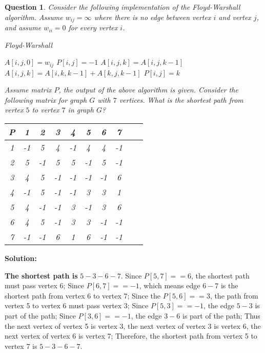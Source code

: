 \documentclass[10.5pt]{article}
\newtheorem{Q}{Question}
\begin{document}
\begin{Q}
	Consider the following implementation of the Floyd-Warshall algorithm. Assume $w_{ij}=\infty$ where there is no edge between vertex $i$ and vertex $j$, and assume $w_{ii}=0$ for every vertex $i$.
	\begin{algorithm}
		\caption{Floyd-Warshall}
		\label{alg:Floyd-Warshall}
		\begin{algorithmic}
			\STATE $A[i,j,0]=w_{ij}$
			\STATE $P[i, j] = -1$
			\ENDFOR
			\ENDFOR
			\STATE $A[i, j, k] = A[i, j, k - 1]$
			\STATE $A[i, j, k] = A[i, k, k - 1] + A[k, j, k - 1]$
			\STATE $P[i, j] = k$
			\ENDIF
			\ENDFOR
			\ENDFOR
			\ENDFOR
		\end{algorithmic}
	\end{algorithm}
	
	Assume matrix $P$, the output of the above algorithm is given. Consider the following matrix for graph $G$ with $7$ vertices. What is the shortest path from vertex $5$ to vertex $7$ in graph $G$?
	
	\begin{table}[htbp]
		\begin{center}  
			\begin{tabular}{|c|c|c|c|c|c|c|c|c| p{3cm}|}  
				\hline  
				P & 1 & 2 & 3 & 4 & 5 & 6 & 7\\ \hline  
				1 & -1 & 5 & 4 & -1 & 4 & 4 & -1\\ \hline    
				2 & 5 & -1 & 5 & 5 & -1 & 5 & -1\\ \hline    
				3 & 4 & 5 & -1 & -1 & -1 & -1 & 6\\ \hline    
				4 & -1 & 5 & -1 & -1 & 3 & 3 & 1\\ \hline    
				5 & 4 & -1 & -1 & 3 & -1 & 3 & 6\\ \hline   
				6 & 4 & 5 & -1 & 3 & 3 & -1 & -1\\ \hline    
				7 & -1 & -1 & 6 & 1 & 6 & -1 & -1\\ 
				\hline  
			\end{tabular}  
		\end{center}  
	\end{table}
\end{Q}
\par\textbf{Solution:}
\par\textbf{The shortest path is }\boldmath$5 - 3 - 6 - 7.$\unboldmath \: 	Since $P[5,7] == 6$, the shortest path must pass vertex 6; Since $P[6,7] == -1$, which means edge $6 - 7$ is the shortest path from vertex 6 to vertex 7; Since the $P[5,6] == 3$, the path from vertex 5 to vertex 6 must pass vertex 3; Since $P[5,3] == -1$, the edge $5 - 3$ is part of the path; Since $P[3,6] == -1$, the edge $3 - 6$ is part of the path; Thus the next vertex of vertex 5 is vertex 3, the next vertex of vertex 3 is vertex 6, the next vertex of vertex 6 is vertex 7; Therefore, the shortest path from vertex 5 to vertex 7 is $5 - 3 - 6 - 7$.
\end{document}
